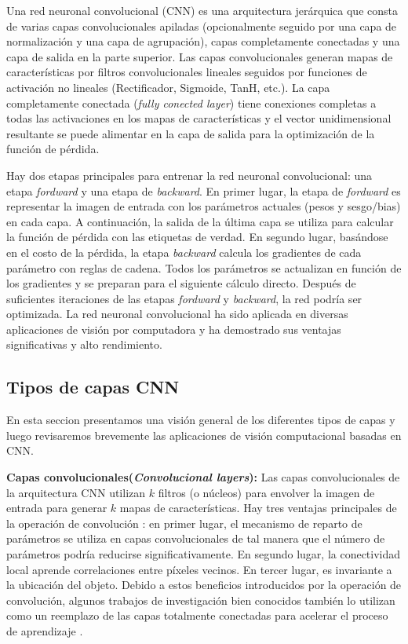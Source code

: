 Una red neuronal convolucional (CNN) es una arquitectura jerárquica \cite{LeCun} que consta de varias capas convolucionales apiladas (opcionalmente seguido por una capa de normalización y una capa de agrupación), capas completamente conectadas y una capa de salida en la parte superior. Las capas convolucionales generan mapas de características por filtros convolucionales lineales seguidos por funciones de activación no lineales (Rectificador, Sigmoide, TanH, etc.). La capa completamente conectada (\textit{fully conected layer}) tiene conexiones completas a todas las activaciones en los mapas de características y el vector unidimensional resultante se puede alimentar en la capa de salida para la optimización de la función de pérdida.

Hay dos etapas principales para entrenar la red neuronal convolucional: una etapa \textit{fordward}  y una etapa de \textit{backward}.  En primer lugar, la etapa de \textit{fordward} es representar la imagen de entrada con los parámetros actuales (pesos y sesgo/bias) en cada capa. A continuación, la salida de la última capa se utiliza para calcular la función de pérdida con las etiquetas de verdad. En segundo lugar, basándose en el costo de la pérdida, la etapa \textit{backward} calcula los gradientes de cada parámetro con reglas de cadena. Todos los parámetros se actualizan en función de los gradientes y se preparan para el siguiente cálculo directo. Después de suficientes iteraciones de las etapas \textit{fordward} y \textit{backward}, la red podría ser optimizada. La red neuronal convolucional ha sido aplicada en diversas aplicaciones de visión por computadora y ha demostrado sus ventajas significativas y alto rendimiento.

\subsection {Tipos de capas CNN}

En esta seccion presentamos una visión general de los diferentes tipos de capas y luego revisaremos brevemente las aplicaciones de visión computacional basadas en CNN.

\textbf{Capas convolucionales(\textit{Convolucional layers}):} Las capas convolucionales de la arquitectura CNN utilizan $k$ filtros (o núcleos) para envolver la imagen de entrada para generar $k$ mapas de características. Hay tres ventajas principales de la operación de convolución \cite{Zeiler}: en primer lugar, el mecanismo de reparto de parámetros se utiliza en capas convolucionales de tal manera que el número de parámetros podría reducirse significativamente. En segundo lugar, la conectividad local aprende correlaciones entre píxeles vecinos. En tercer lugar, es invariante a la ubicación del objeto. Debido a estos beneficios introducidos por la operación de convolución, algunos trabajos de investigación bien conocidos también lo utilizan como un reemplazo de las capas totalmente conectadas para acelerar el proceso de aprendizaje \cite{Szegedy,Oquab}.

